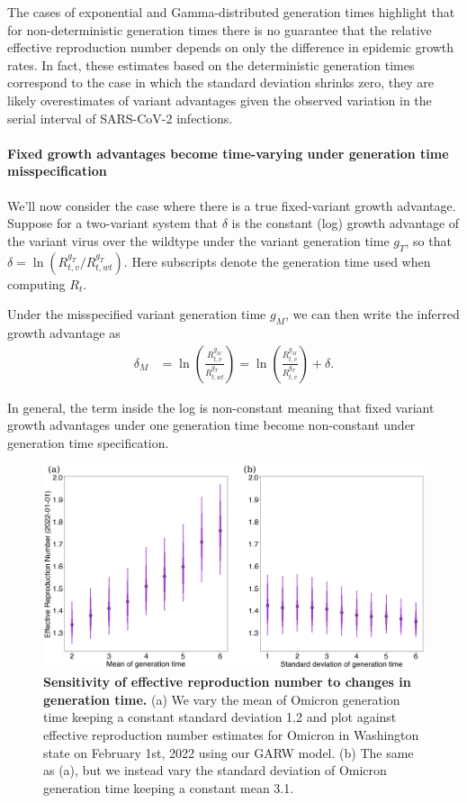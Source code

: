 \documentclass[11pt,oneside,letterpaper]{article}
\begin{document}
The cases of exponential and Gamma-distributed generation times highlight that for non-deterministic generation times there is no guarantee that the relative effective reproduction number depends on only the difference in epidemic growth rates.
In fact, these estimates based on the deterministic generation times correspond to the case in which the standard deviation shrinks zero, they are likely overestimates of variant advantages given the observed variation in the serial interval of SARS-CoV-2 infections.

\paragraph{Fixed growth advantages become time-varying under generation time misspecification}

We'll now consider the case where there is a true fixed-variant growth advantage. Suppose for a two-variant system that $\delta$ is the constant (log) growth advantage of the variant virus over the wildtype under the variant generation time $g_{T}$, so that $\delta = \ln \left( R_{t,v}^{g_{T}} / R_{t, wt}^{g_{T}} \right)$.
Here subscripts denote the generation time used when computing $R_{t}$.

Under the misspecified variant generation time $g_{M}$, we can then write the inferred growth advantage as
\begin{align*}
  \delta_{M} &= \ln \left( \frac{R_{t,v}^{g_{M}}}{R_{t, wt}^{g_{T}}} \right) = \ln \left(\frac{R_{t,v}^{g_{M}}}{R_{t,v}^{g_{T}}}\right) + \delta.
\end{align*}

In general, the term inside the log is non-constant meaning that fixed variant growth advantages under one generation time become non-constant under generation time specification.



\begin{figure}
  \centering
  \includegraphics[width=\linewidth]{figs/generation_time_sensitivity.png}
  \caption{\textbf{Sensitivity of effective reproduction number to changes in generation time.} 
(a) We vary the mean of Omicron generation time keeping a constant standard deviation 1.2 and plot against effective reproduction number estimates for Omicron in Washington state on February 1st, 2022 using our GARW model.
(b) The same as (a), but we instead vary the standard deviation of Omicron generation time keeping a constant mean 3.1.}%
  \label{fig:generation_time_sensitivity}
\end{figure}
\end{document}
